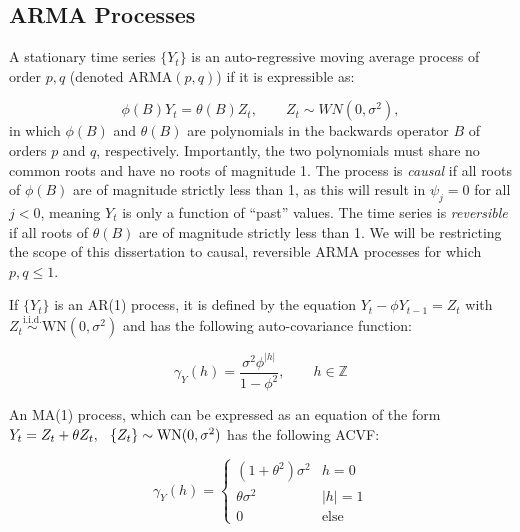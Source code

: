 \subsection{ARMA Processes}


A stationary time series $\{Y_t\}$ is an  auto-regressive moving average process of order $p,q$ (denoted ARMA$(p,q)$)  if it is expressible as:

\begin{equation}
    \label{eq:ARMA}
    \phi(B)Y_t = \theta(B)Z_t, \qquad Z_t \sim WN(0,\sigma^2),
\end{equation}
in which $\phi(B)$ and $\theta(B)$ are polynomials in the backwards operator $B$ of orders $p$ and $q$, respectively. Importantly, the two polynomials must share no common roots and have no roots of magnitude 1. The process is \textit{causal} if all roots of $\phi(B)$ are of magnitude strictly less than 1, as this will result in $\psi_j = 0$ for all $j<0$, meaning $Y_t$ is only a function of ``past'' values. The time series is \textit{reversible} if all roots of $\theta(B)$ are of magnitude strictly less than 1. We will be restricting the scope of this dissertation to causal, reversible ARMA processes for which $p,q \leq1$. 

If $\{Y_t\}$ is an AR(1) process, it is defined by the equation $Y_t-\phi Y_{t-1} = Z_t$ with $Z_t \overset{\text{i.i.d.}}{\sim}\text{WN}(0,\sigma^2)$ and has the following auto-covariance function:

\begin{equation}
    \label{eq:acvf_ar}
    \gamma_Y(h) = \frac{\sigma^2\phi^{|h|}}{1-\phi^2}, \qquad h \in \mathbb{Z}
\end{equation}






An MA(1) process, which can be expressed as an equation of the form $Y_t = Z_t + \theta Z_t, \hspace{.1in}\{Z_t\}\sim \text{WN}(0,\sigma^2)$ has the following ACVF:

\begin{equation}
    \label{eq:acvf_ma}
    \gamma_Y(h) = \begin{cases}
        (1 + \theta^2)\sigma^2 & h = 0 \\
        \theta\sigma^2 & |h| = 1 \\
        0 & \text{else}
    \end{cases}
\end{equation}






